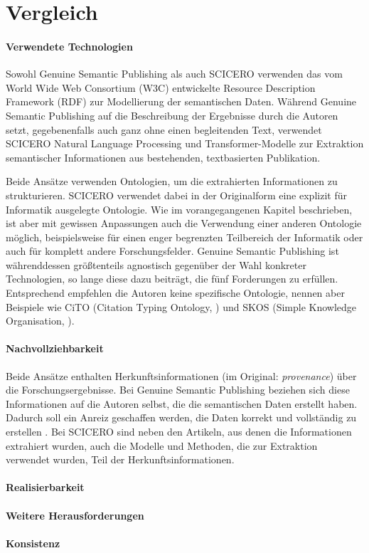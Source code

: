 \section{Vergleich}
\label{sec:vergleich}


\paragraph{Verwendete Technologien}

Sowohl Genuine Semantic Publishing als auch SCICERO verwenden das vom World Wide Web Consortium (W3C) entwickelte Resource Description Framework (RDF) zur Modellierung der semantischen Daten.
Während Genuine Semantic Publishing auf die Beschreibung der Ergebnisse durch die Autoren setzt, gegebenenfalls auch ganz ohne einen begleitenden Text, verwendet SCICERO Natural Language Processing und Transformer-Modelle zur Extraktion semantischer Informationen aus bestehenden, textbasierten Publikation.

Beide Ansätze verwenden Ontologien, um die extrahierten Informationen zu strukturieren.
SCICERO verwendet dabei in der Originalform eine explizit für Informatik ausgelegte Ontologie.
Wie im vorangegangenen Kapitel beschrieben, ist aber mit gewissen Anpassungen auch die Verwendung einer anderen Ontologie möglich, beispielsweise für einen enger begrenzten Teilbereich der Informatik oder auch für komplett andere Forschungsfelder.
Genuine Semantic Publishing ist währenddessen größtenteils agnostisch gegenüber der Wahl konkreter Technologien, so lange diese dazu beiträgt, die fünf Forderungen zu erfüllen.
Entsprechend empfehlen die Autoren keine spezifische Ontologie, nennen aber Beispiele wie CiTO (Citation Typing Ontology, \cite{cito}) und SKOS (Simple Knowledge Organisation, \cite{skos}).

\paragraph{Nachvollziehbarkeit}

Beide Ansätze enthalten Herkunftsinformationen (im Original: \textit{provenance}) über die Forschungsergebnisse.
Bei Genuine Semantic Publishing beziehen sich diese Informationen auf die Autoren selbst, die die semantischen Daten erstellt haben.
Dadurch soll ein Anreiz geschaffen werden, die Daten korrekt und vollständig zu erstellen \cite{kuhn2017genuine}.
Bei SCICERO sind neben den Artikeln, aus denen die Informationen extrahiert wurden, auch die Modelle und Methoden, die zur Extraktion verwendet wurden, Teil der Herkunftsinformationen.



\paragraph{Realisierbarkeit}

\paragraph{Weitere Herausforderungen}

\paragraph{Konsistenz}
